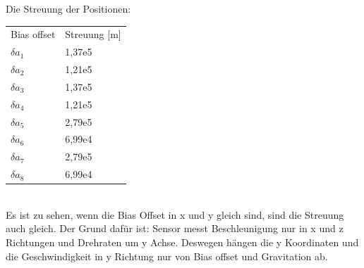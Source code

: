 \begin{figure}[ht]
	\label{fig:Trajektorie rückwärt}
\end{figure}
\clearpage
Die Streuung der Positionen:
\begin{table}[htpb] \centering
	\begin{tabular}{ll}
		Bias offset & Streuung [m] \\
		$\delta a_1$ & 1,37e5 \\
		$\delta a_2$ & 1,21e5 \\
		$\delta a_3$ & 1,37e5  \\
		$\delta a_4$ & 1,21e5  \\
		$\delta a_5$ & 2,79e5  \\
		$\delta a_6$ & 6,99e4  \\
		$\delta a_7$ & 2,79e5   \\
		$\delta a_8$ & 6,99e4 
	\end{tabular}
\end{table}\\
Es ist zu sehen, wenn die Bias Offset in x und y gleich sind, sind die Streuung auch gleich. Der Grund dafür ist: Sensor messt Beschleunigung nur in x und z Richtungen und Drehraten um y Achse. Deswegen hängen die y Koordinaten und die Geschwindigkeit in y Richtung nur von Bias offset und Gravitation ab. 










